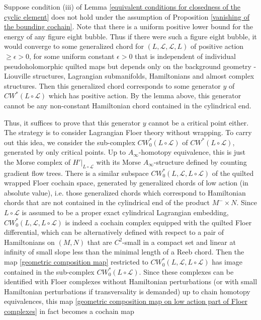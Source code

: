 \documentclass{amsart}
\numberwithin{equation}{section}
\numberwithin{figure}{section}
\begin{document}
	Suppose condition (iii) of Lemma \eqref{equivalent conditions for closedness of the cyclic element} does not hold under the assumption of Proposition \ref{vanishing of the bounding cochain}. Note that there is a uniform positive lower bound for the energy of any figure eight bubble. Thus if there were such a figure eight bubble, it would converge to some generalized chord for $(L, \mathcal{L}, \mathcal{L}, L)$ of positive action $\ge \epsilon > 0$, for some uniform constant $\epsilon > 0$ that is independent of individual pseudoholomorphic quilted maps but depends only on the background geometry - Liouville structures, Lagrangian submanifolds, Hamiltonians and almost complex structures.
Then this generalized chord corresponds to some generator $y$ of $CW^{*}(L \circ \mathcal{L})$ which has positive action.
By the lemma above, this generator cannot be any non-constant Hamiltonian chord contained in the cylindrical end. \par
	Thus, it suffices to prove that this generator $y$ cannot be a critical point either. The strategy is to consider Lagrangian Floer theory without wrapping. 
To carry out this idea, we consider the sub-complex $CW^{*}_{0}(L \circ \mathcal{L})$ of $CW^{*}(L \circ \mathcal{L})$, generated by only critical points. Up to $A_{\infty}$-homotopy equivalence, this is just the Morse complex of $H'|_{L \circ \mathcal{L}}$ with its Morse $A_{\infty}$-structure defined by counting gradient flow trees.
There is a similar subspace $CW^{*}_{0}(L, \mathcal{L}, L \circ \mathcal{L})$ of the quilted wrapped Floer cochain space, generated by generalized chords of low action (in absolute value), i.e. those generalized chords which correspond to Hamiltonian chords that are not contained in the cylindrical end of the product $M^{-} \times N$.
Since $L \circ \mathcal{L}$ is assumed to be a proper exact cylindrical Lagrangian embedding, $CW^{*}_{0}(L, \mathcal{L}, L \circ \mathcal{L})$ is indeed a cochain complex equipped with the quilted Floer differential, which can be alternatively defined with respect to a pair of Hamiltonians on $(M, N)$ that are $C^{2}$-small in a compact set and linear at infinity of small slope less than the minimal length of a Reeb chord. 
Then the map \eqref{geometric composition map} restricted to $CW^{*}_{0}(L, \mathcal{L}, L \circ \mathcal{L})$ has image  contained in the sub-complex $CW^{*}_{0}(L \circ \mathcal{L})$. Since these complexes can be identified with Floer complexes without Hamiltonian perturbations (or with small Hamiltonian perturbations if transversality is demanded) up to chain homotopy equivalences, this map \eqref{geometric composition map on low action part of Floer complexes} in fact becomes a cochain map
\end{document}
